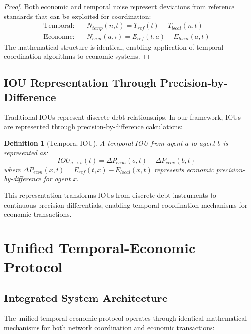 \documentclass[12pt,a4paper]{article}
\newtheorem{definition}[theorem]{Definition}
\begin{document}
\begin{proof}
Both economic and temporal noise represent deviations from reference standards that can be exploited for coordination:
\begin{align}
\text{Temporal:} \quad &N_{temp}(n,t) = T_{ref}(t) - T_{local}(n,t) \\
\text{Economic:} \quad &N_{econ}(a,t) = E_{ref}(t,a) - E_{local}(a,t)
\end{align}
The mathematical structure is identical, enabling application of temporal coordination algorithms to economic systems.
\end{proof}

\subsection{IOU Representation Through Precision-by-Difference}

Traditional IOUs represent discrete debt relationships. In our framework, IOUs are represented through precision-by-difference calculations:

\begin{definition}[Temporal IOU]
A temporal IOU from agent $a$ to agent $b$ is represented as:
\begin{equation}
IOU_{a \rightarrow b}(t) = \Delta P_{econ}(a,t) - \Delta P_{econ}(b,t)
\end{equation}
where $\Delta P_{econ}(x,t) = E_{ref}(t,x) - E_{local}(x,t)$ represents economic precision-by-difference for agent $x$.
\end{definition}

This representation transforms IOUs from discrete debt instruments to continuous precision differentials, enabling temporal coordination mechanisms for economic transactions.

\section{Unified Temporal-Economic Protocol}

\subsection{Integrated System Architecture}

The unified temporal-economic protocol operates through identical mathematical mechanisms for both network coordination and economic transactions:
\end{document}
